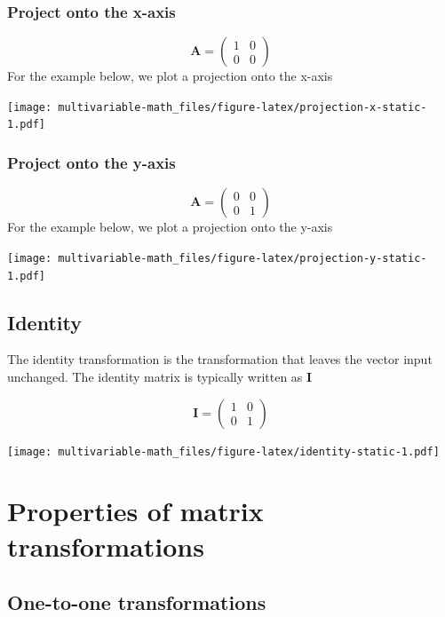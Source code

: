\documentclass[
]{book}
\theoremstyle{definition}
\theoremstyle{definition}
\theoremstyle{definition}
\theoremstyle{remark}
\begin{document}
\hypertarget{project-onto-the-x-axis}{%
\subsubsection{Project onto the x-axis}\label{project-onto-the-x-axis}}

\[
\mathbf{A} = \begin{pmatrix}
1 & 0 \\
0 & 0
\end{pmatrix}
\]
For the example below, we plot a projection onto the x-axis

\texttt{[image: multivariable-math\_files/figure-latex/projection-x-static-1.pdf]}

\hypertarget{project-onto-the-y-axis}{%
\subsubsection{Project onto the y-axis}\label{project-onto-the-y-axis}}

\[
\mathbf{A} = \begin{pmatrix}
0 & 0 \\
0 & 1
\end{pmatrix}
\]
For the example below, we plot a projection onto the y-axis

\texttt{[image: multivariable-math\_files/figure-latex/projection-y-static-1.pdf]}

\hypertarget{identity}{%
\subsection{Identity}\label{identity}}

The identity transformation is the transformation that leaves the vector input unchanged. The identity matrix is typically written as \(\mathbf{I}\)

\[
\mathbf{I} = \begin{pmatrix}
1 & 0 \\
0 & 1
\end{pmatrix}
\]

\texttt{[image: multivariable-math\_files/figure-latex/identity-static-1.pdf]}

\hypertarget{properties-of-matrix-transformations}{%
\section{Properties of matrix transformations}\label{properties-of-matrix-transformations}}

\hypertarget{one-to-one-transformations}{%
\subsection{One-to-one transformations}\label{one-to-one-transformations}}
\end{document}
